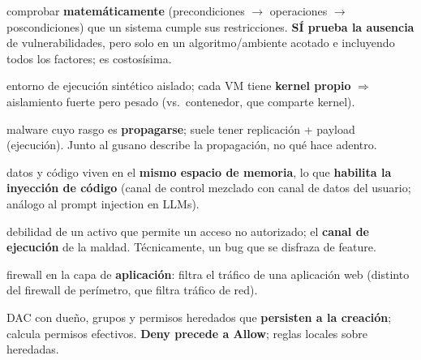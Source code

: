 \documentclass[../main.tex]{subfiles}
\begin{document}
\begin{description}[leftmargin=0pt, style=unboxed, itemsep=1pt, parsep=0pt]
  \item[\textbf{Verificación formal}] comprobar \textbf{matemáticamente} (precondiciones $\to$ operaciones $\to$ poscondiciones) que un sistema cumple sus restricciones. \textbf{SÍ prueba la ausencia} de vulnerabilidades, pero solo en un algoritmo/ambiente acotado e incluyendo todos los factores; es costosísima.
  \item[\textbf{Virtualización (VM)}] entorno de ejecución sintético aislado; cada VM tiene \textbf{kernel propio} $\Rightarrow$ aislamiento fuerte pero pesado (vs.\ contenedor, que comparte kernel).
  \item[\textbf{Virus}] malware cuyo rasgo es \textbf{propagarse}; suele tener replicación + payload (ejecución). Junto al gusano describe la propagación, no qué hace adentro.
  \item[\textbf{Von Neumann (arquitectura)}] datos y código viven en el \textbf{mismo espacio de memoria}, lo que \textbf{habilita la inyección de código} (canal de control mezclado con canal de datos del usuario; análogo al prompt injection en LLMs).
  \item[\textbf{Vulnerabilidad}] debilidad de un activo que permite un acceso no autorizado; el \textbf{canal de ejecución} de la maldad. Técnicamente, un bug que se disfraza de feature.
\end{description}

\begin{description}[leftmargin=0pt, style=unboxed, itemsep=1pt, parsep=0pt]
  \item[\textbf{WAF (Web Application Firewall)}] firewall en la capa de \textbf{aplicación}: filtra el tráfico de una aplicación web (distinto del firewall de perímetro, que filtra tráfico de red).
  \item[\textbf{Windows file system}] DAC con dueño, grupos y permisos heredados que \textbf{persisten a la creación}; calcula permisos efectivos. \textbf{Deny precede a Allow}; reglas locales sobre heredadas.
\end{description}
\end{document}
